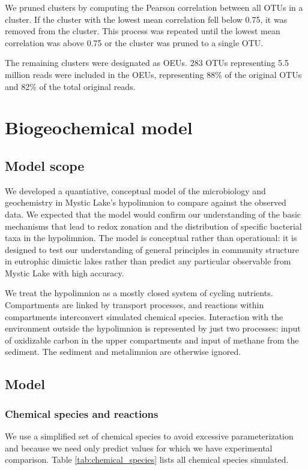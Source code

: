 \documentclass{report}
\begin{document}
We pruned clusters by computing the Pearson correlation between all OTUs in a cluster. If the cluster with the lowest mean correlation fell below 0.75, it was removed from the cluster. This process was repeated until the lowest mean correlation  was above 0.75 or the cluster was pruned to a single OTU.

The remaining clusters were designated as OEUs. 283 OTUs representing 5.5 million reads were included in the OEUs, representing 88\% of the original OTUs and 82\% of the total original reads.


\chapter{Biogeochemical model}
\section{Model scope}
We developed a quantiative, conceptual model of the microbiology and geochemistry in Mystic Lake's
hypolimnion to compare against the observed data. We expected that the model would confirm
our understanding of the basic mechanisms that lead to redox zonation and the distribution
of specific bacterial taxa in the hypolimnion. The model is conceptual rather than operational: it
is designed to test our understanding of general principles in community structure in
eutrophic dimictic lakes rather than predict any particular observable from Mystic Lake with
high accuracy.

We treat the hypolimnion as a mostly closed system of cycling nutrients. Compartments are
linked by transport processes, and reactions within compartments interconvert simulated chemical
species. Interaction with the environment outside the hypolimnion is represented by just two
processes: input of oxidizable carbon in the upper compartments and input of methane from
the sediment. The sediment and metalimnion are otherwise ignored.

\section{Model}
\subsection{Chemical species and reactions}
We use a simplified set of chemical species to avoid excessive parameterization and
because we need only predict values for which we have experimental comparison. Table
\ref{tab:chemical_species} lists all chemical species simulated.
\end{document}
